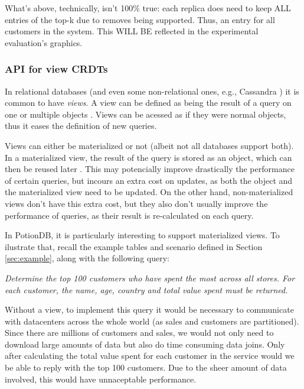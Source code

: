 \documentclass{vldb}
\newcommand{\grumbler}[2]{{\color{red}{\bf #1:} #2}}
\newcommand{\andre}[1]{\grumbler{andre}{#1}}
\newcommand{\emphvspace}{0.5\baselineskip}
\newcommand{\lineemph}[1]{\vspace{\emphvspace}\hspace{2em}\emph{#1}\vspace{\emphvspace}}
\begin{document}
\andre{What's above, technically, isn't 100\% true: each replica does need to keep ALL entries of the top-k due to removes being supported. Thus, an entry for all customers in the system. This WILL BE reflected in the experimental evaluation's graphics.}

\subsubsection{API for view CRDTs}

In relational databases (and even some non-relational ones, e.g., Cassandra \cite{???}) it is common to have \emph{views}. 
A view can be defined as being the result of a query on one or multiple objects \cite{???}.
Views can be acessed as if they were normal objects, thus it eases the definition of new queries.

Views can either be materialized or not (albeit not all databases support both). %
In a materialized view, the result of the query is stored as an object, which can then be reused later \cite{???}.
This may potencially improve drastically the performance of certain queries, but incours an extra cost on updates, as both the object and the materialized view need to be updated.
On the other hand, non-materialized views don't have this extra cost, but they also don't usually improve the performance of queries, as their result is re-calculated on each query.


In PotionDB, it is particularly interesting to support materialized views.
To ilustrate that, recall the example tables and scenario defined in Section \ref{sec:example}, along with the following query: 

\lineemph{Determine the top 100 customers who have spent the most across all stores. For each customer, the name, age, country and total value spent must be returned.}

Without a view, to implement this query it would be necessary to communicate with datacenters across the whole world (as sales and customers are partitioned). 
Since there are millions of customers and sales, we would not only need to download large amounts of data but also do time consuming data joins.
Only after calculating the total value spent for each customer in the service would we be able to reply with the top 100 customers.
Due to the sheer amount of data involved, this would have unnaceptable performance.
\end{document}
